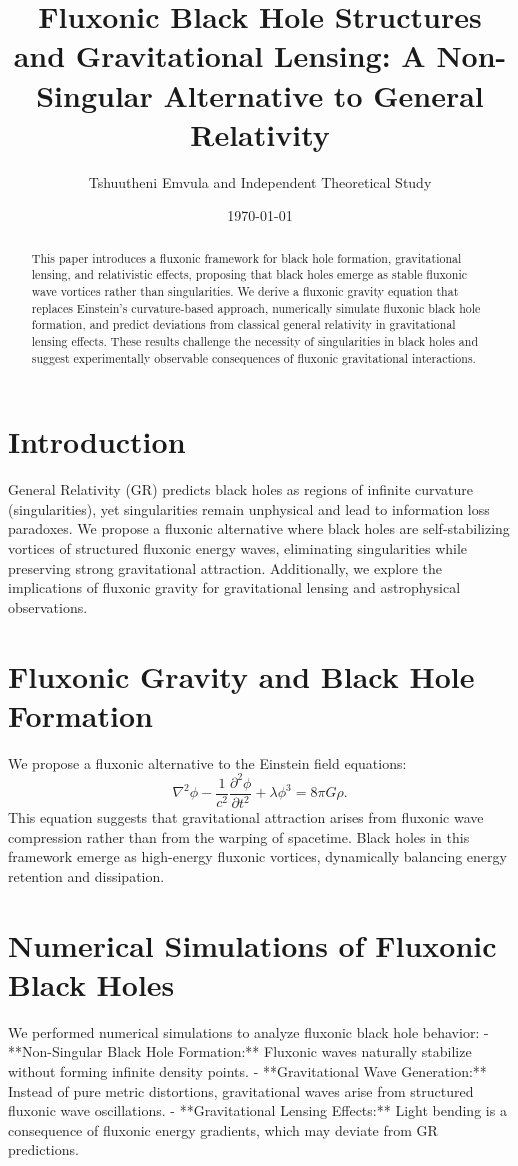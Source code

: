 \documentclass{article}
\title{Fluxonic Black Hole Structures and Gravitational Lensing: A Non-Singular Alternative to General Relativity}
\author{Tshuutheni Emvula and Independent Theoretical Study}
\date{\today}
\begin{document}
\maketitle

\begin{abstract}
This paper introduces a fluxonic framework for black hole formation, gravitational lensing, and relativistic effects, proposing that black holes emerge as stable fluxonic wave vortices rather than singularities. We derive a fluxonic gravity equation that replaces Einstein's curvature-based approach, numerically simulate fluxonic black hole formation, and predict deviations from classical general relativity in gravitational lensing effects. These results challenge the necessity of singularities in black holes and suggest experimentally observable consequences of fluxonic gravitational interactions.
\end{abstract}

\section{Introduction}
General Relativity (GR) predicts black holes as regions of infinite curvature (singularities), yet singularities remain unphysical and lead to information loss paradoxes. We propose a fluxonic alternative where black holes are self-stabilizing vortices of structured fluxonic energy waves, eliminating singularities while preserving strong gravitational attraction. Additionally, we explore the implications of fluxonic gravity for gravitational lensing and astrophysical observations.

\section{Fluxonic Gravity and Black Hole Formation}
We propose a fluxonic alternative to the Einstein field equations:
\begin{equation}
    \nabla^2 \phi - \frac{1}{c^2} \frac{\partial^2 \phi}{\partial t^2} + \lambda \phi^3 = 8 \pi G \rho.
\end{equation}
This equation suggests that gravitational attraction arises from fluxonic wave compression rather than from the warping of spacetime. Black holes in this framework emerge as high-energy fluxonic vortices, dynamically balancing energy retention and dissipation.

\section{Numerical Simulations of Fluxonic Black Holes}
We performed numerical simulations to analyze fluxonic black hole behavior:
- **Non-Singular Black Hole Formation:** Fluxonic waves naturally stabilize without forming infinite density points.
- **Gravitational Wave Generation:** Instead of pure metric distortions, gravitational waves arise from structured fluxonic wave oscillations.
- **Gravitational Lensing Effects:** Light bending is a consequence of fluxonic energy gradients, which may deviate from GR predictions.
\end{document}
